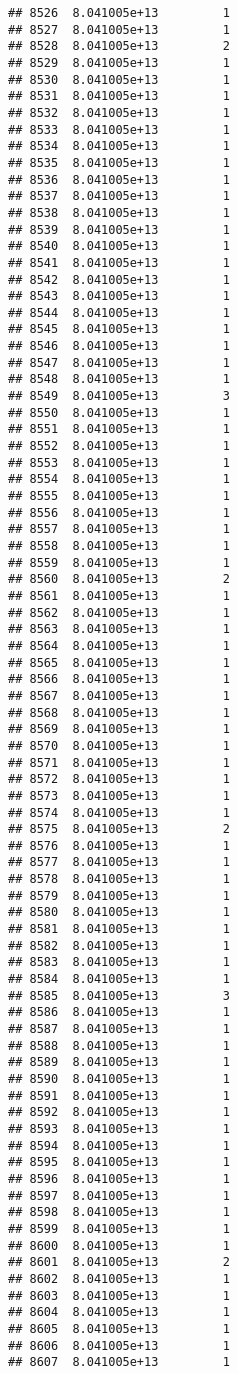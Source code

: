 \documentclass[
]{article}
\begin{document}
\begin{verbatim}
## 8526  8.041005e+13         1
## 8527  8.041005e+13         1
## 8528  8.041005e+13         2
## 8529  8.041005e+13         1
## 8530  8.041005e+13         1
## 8531  8.041005e+13         1
## 8532  8.041005e+13         1
## 8533  8.041005e+13         1
## 8534  8.041005e+13         1
## 8535  8.041005e+13         1
## 8536  8.041005e+13         1
## 8537  8.041005e+13         1
## 8538  8.041005e+13         1
## 8539  8.041005e+13         1
## 8540  8.041005e+13         1
## 8541  8.041005e+13         1
## 8542  8.041005e+13         1
## 8543  8.041005e+13         1
## 8544  8.041005e+13         1
## 8545  8.041005e+13         1
## 8546  8.041005e+13         1
## 8547  8.041005e+13         1
## 8548  8.041005e+13         1
## 8549  8.041005e+13         3
## 8550  8.041005e+13         1
## 8551  8.041005e+13         1
## 8552  8.041005e+13         1
## 8553  8.041005e+13         1
## 8554  8.041005e+13         1
## 8555  8.041005e+13         1
## 8556  8.041005e+13         1
## 8557  8.041005e+13         1
## 8558  8.041005e+13         1
## 8559  8.041005e+13         1
## 8560  8.041005e+13         2
## 8561  8.041005e+13         1
## 8562  8.041005e+13         1
## 8563  8.041005e+13         1
## 8564  8.041005e+13         1
## 8565  8.041005e+13         1
## 8566  8.041005e+13         1
## 8567  8.041005e+13         1
## 8568  8.041005e+13         1
## 8569  8.041005e+13         1
## 8570  8.041005e+13         1
## 8571  8.041005e+13         1
## 8572  8.041005e+13         1
## 8573  8.041005e+13         1
## 8574  8.041005e+13         1
## 8575  8.041005e+13         2
## 8576  8.041005e+13         1
## 8577  8.041005e+13         1
## 8578  8.041005e+13         1
## 8579  8.041005e+13         1
## 8580  8.041005e+13         1
## 8581  8.041005e+13         1
## 8582  8.041005e+13         1
## 8583  8.041005e+13         1
## 8584  8.041005e+13         1
## 8585  8.041005e+13         3
## 8586  8.041005e+13         1
## 8587  8.041005e+13         1
## 8588  8.041005e+13         1
## 8589  8.041005e+13         1
## 8590  8.041005e+13         1
## 8591  8.041005e+13         1
## 8592  8.041005e+13         1
## 8593  8.041005e+13         1
## 8594  8.041005e+13         1
## 8595  8.041005e+13         1
## 8596  8.041005e+13         1
## 8597  8.041005e+13         1
## 8598  8.041005e+13         1
## 8599  8.041005e+13         1
## 8600  8.041005e+13         1
## 8601  8.041005e+13         2
## 8602  8.041005e+13         1
## 8603  8.041005e+13         1
## 8604  8.041005e+13         1
## 8605  8.041005e+13         1
## 8606  8.041005e+13         1
## 8607  8.041005e+13         1

\end{verbatim}
\end{document}
